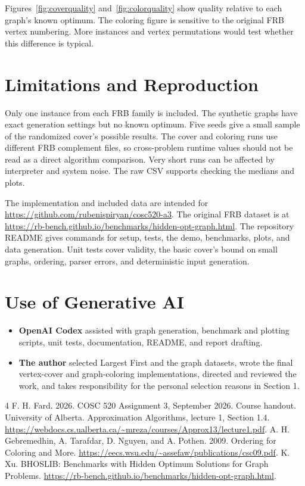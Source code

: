 \documentclass[acmsmall,nonacm]{acmart}
\begin{document}
Figures~\ref{fig:coverquality} and~\ref{fig:colorquality} show quality relative to each graph's known optimum. The coloring figure is sensitive to the original FRB vertex numbering. More instances and vertex permutations would test whether this difference is typical.

\section{Limitations and Reproduction}
Only one instance from each FRB family is included. The synthetic graphs have exact generation settings but no known optimum. Five seeds give a small sample of the randomized cover's possible results. The cover and coloring runs use different FRB complement files, so cross-problem runtime values should not be read as a direct algorithm comparison. Very short runs can be affected by interpreter and system noise. The raw CSV supports checking the medians and plots.

The implementation and included data are intended for \url{https://github.com/rubenispiryan/cosc520-a3}. The original FRB dataset is at \url{https://rb-bench.github.io/benchmarks/hidden-opt-graph.html}. The repository README gives commands for setup, tests, the demo, benchmarks, plots, and data generation. Unit tests cover validity, the basic cover's bound on small graphs, ordering, parser errors, and deterministic input generation.

\section*{Use of Generative AI}
\begin{itemize}
\item \textbf{OpenAI Codex} assisted with graph generation, benchmark and plotting scripts, unit tests, documentation, README, and report drafting.
\item \textbf{The author} selected Largest First and the graph datasets, wrote the final vertex-cover and graph-coloring implementations, directed and reviewed the work, and takes responsibility for the personal selection reasons in Section 1.
\end{itemize}

\begin{thebibliography}{4}
F. H. Fard. 2026. COSC 520 Assignment 3, September 2026. Course handout.
University of Alberta. Approximation Algorithms, lecture 1, Section 1.4. \url{https://webdocs.cs.ualberta.ca/~mreza/courses/Approx13/lecture1.pdf}.
A. H. Gebremedhin, A. Tarafdar, D. Nguyen, and A. Pothen. 2009. Ordering for Coloring and More. \url{https://eecs.wsu.edu/~assefaw/publications/csc09.pdf}.
K. Xu. BHOSLIB: Benchmarks with Hidden Optimum Solutions for Graph Problems. \url{https://rb-bench.github.io/benchmarks/hidden-opt-graph.html}.
\end{thebibliography}
\end{document}
